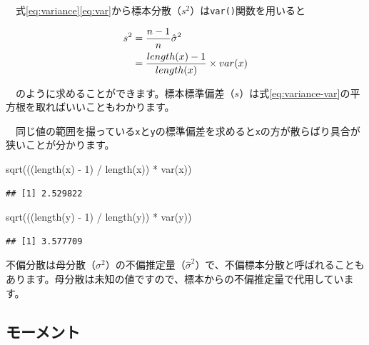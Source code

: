\documentclass[
  12pt,
]{book}
\newenvironment{Shaded}{\begin{snugshade}}{\end{snugshade}}
\newcommand{\DecValTok}[1]{\textcolor[rgb]{0.00,0.00,0.81}{#1}}
\newcommand{\FunctionTok}[1]{\textcolor[rgb]{0.00,0.00,0.00}{#1}}
\newcommand{\NormalTok}[1]{#1}
\newcommand{\SpecialCharTok}[1]{\textcolor[rgb]{0.00,0.00,0.00}{#1}}
\begin{document}
　式\eqref{eq:variance}\eqref{eq:var}から標本分散（\(s^2\)）は\texttt{var()}関数を用いると

\begin{align}
  s^2 &= \frac{n - 1}{n}\hat{\sigma}^2 \label{eq:variance-var} \\
  &= \frac{length(x) - 1}{length(x)} \times var(x) \notag
\end{align}

　のように求めることができます。標本標準偏差（\(s\)）は式\eqref{eq:variance-var}の平方根を取ればいいこともわかります。

　同じ値の範囲を撮っている\texttt{x}と\texttt{y}の標準偏差を求めると\texttt{x}の方が散らばり具合が狭いことが分かります。

\begin{Shaded}
\begin{Highlighting}[numbers=left,,]
\FunctionTok{sqrt}\NormalTok{(((}\FunctionTok{length}\NormalTok{(x) }\SpecialCharTok{{-}} \DecValTok{1}\NormalTok{) }\SpecialCharTok{/} \FunctionTok{length}\NormalTok{(x)) }\SpecialCharTok{*} \FunctionTok{var}\NormalTok{(x))}
\end{Highlighting}
\end{Shaded}

\begin{verbatim}
## [1] 2.529822
\end{verbatim}

\begin{Shaded}
\begin{Highlighting}[numbers=left,,]
\FunctionTok{sqrt}\NormalTok{(((}\FunctionTok{length}\NormalTok{(y) }\SpecialCharTok{{-}} \DecValTok{1}\NormalTok{) }\SpecialCharTok{/} \FunctionTok{length}\NormalTok{(y)) }\SpecialCharTok{*} \FunctionTok{var}\NormalTok{(y))}
\end{Highlighting}
\end{Shaded}

\begin{verbatim}
## [1] 3.577709
\end{verbatim}

\begin{hint-box}
不偏分散は母分散（$\sigma^2$）の不偏推定量（$\hat{\sigma}^2$）で、不偏標本分散と呼ばれることもあります。母分散は未知の値ですので、標本からの不偏推定量で代用しています。
\end{hint-box}

\newpage

\hypertarget{ux30e2ux30fcux30e1ux30f3ux30c8}{%
\subsection{モーメント}\label{ux30e2ux30fcux30e1ux30f3ux30c8}}
\end{document}
